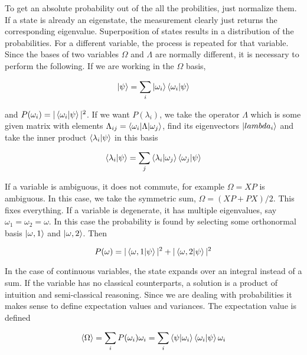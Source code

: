 \documentclass{tufte-book}
\begin{document}
To get an absolute probability out of the all the probilities, just normalize them. If a state is already an eigenstate, the measurement clearly just returns the corresponding eigenvalue. Superposition of states results in a distribution of the probabilities. For a different variable, the process is repeated for that variable. Since the bases of two variables $\Omega$ and $\Lambda$ are normally different, it is necessary to perform the following. If we are working in the $\Omega$ basis,

\begin{equation}
	\label{eq:29}
	\ket{\psi} = \sum_i\ket{\omega_i}\braket{\omega_i|\psi}
\end{equation}

and $P(\omega_i) = |\braket{\omega_i|\psi}|^2$. If we want $P(\lambda_i)$, we take the operator $\Lambda$ which is some given matrix with elements $\Lambda_{ij} = \braket{\omega_i|\Lambda|\omega_j}$, find its eigenvectors $\ket{lambda_i}$ and take the inner product $\braket{\lambda_i|\psi}$ in this basis

\begin{equation}
	\label{eq:30}
	\braket{\lambda_i|\psi} = \sum_j\braket{\lambda_i|\omega_j}\braket{\omega_j|\psi}
\end{equation}

If a variable is ambiguous, it does not commute, for example $\Omega = XP$ is ambiguous. In this case, we take the symmetric sum, $\Omega = (XP + PX)/2$. This fixes everything. If a variable is degenerate, it has multiple eigenvalues, say $\omega_1 = \omega_2 = \omega$. In this case the probability is found by selecting some orthonormal basis $\ket{\omega, 1}$ and $\ket{\omega, 2}$. Then

\begin{equation}
	\label{eq:31}
	P(\omega) = |\braket{\omega, 1|\psi}|^2 + |\braket{\omega, 2|\psi}|^2
\end{equation}

In the case of continuous variables, the state expands over an integral instead of a sum. If the variable has no classical counterparts, a solution is a product of intuition and semi-classical reasoning. Since we are dealing with probabilities it makes sense to define expectation values and variances. The expectation value is defined

\begin{equation}
	\label{eq:32}
	\langle\Omega\rangle = \sum_i P(\omega_i)\omega_i = \sum_i\braket{\psi|\omega_i}\braket{\omega_i|\psi}\omega_i
\end{equation}
\end{document}
